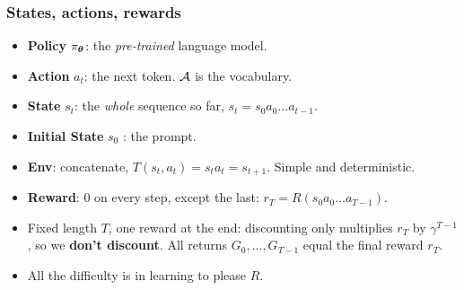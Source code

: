 \begin{frame}
    \frametitle{States, actions, rewards}
    \begin{itemize}
        \item \textbf{Policy} $\pi_{\boldsymbol{\theta}}$: the \textit{pre-trained} language model.
        \item \textbf{Action} $a_t$: the next token. $\mathcal{A}$ is the vocabulary.
        \item \textbf{State} $s_t$: the \textit{whole} sequence so far, $s_t = s_0 a_0 \ldots a_{t-1}$.
        \item \textbf{Initial State} $s_0$ : the prompt.
        \item \textbf{Env}: concatenate, $T(s_t, a_t) = s_t a_t = s_{t+1}$. Simple and deterministic.
    \end{itemize}
    \begin{center}
    \end{center}
    \pause
    \begin{itemize}
        \item \textbf{Reward}: $0$ on every step, except the last: $r_T = R(s_0 a_0 \ldots a_{T-1})$.
        \item Fixed length $T$, one reward at the end: discounting only multiplies $r_T$ by
        $\gamma^{T-1}$, so we \textbf{don't discount}. All returns $G_0,\ldots,G_{T-1}$ equal the final reward $r_T$.
        \item All the difficulty is in learning to please $R$.
    \end{itemize}
\end{frame}


